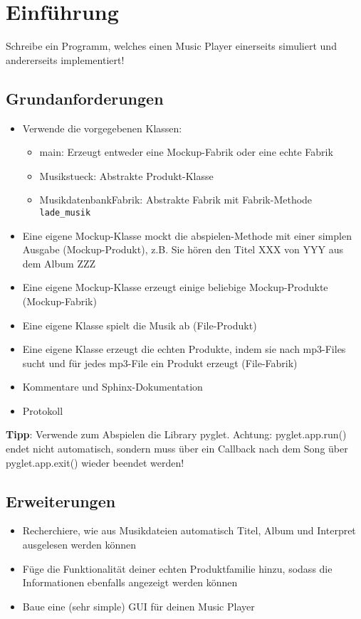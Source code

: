 
\section{Einführung}
Schreibe ein Programm, welches einen Music Player einerseits simuliert und andererseits implementiert!

\subsection{Grundanforderungen}
\begin{itemize}
\item Verwende die vorgegebenen Klassen:
	\begin{itemize}
		\item main: Erzeugt entweder eine Mockup-Fabrik oder eine echte Fabrik
		\item Musikstueck: Abstrakte Produkt-Klasse
		\item MusikdatenbankFabrik: Abstrakte Fabrik mit Fabrik-Methode \verb|lade_musik|
	\end{itemize}
\item Eine eigene Mockup-Klasse mockt die abspielen-Methode mit einer simplen Ausgabe (Mockup-Produkt), z.B. Sie hören den Titel XXX von YYY aus dem Album ZZZ
\item Eine eigene Mockup-Klasse erzeugt einige beliebige Mockup-Produkte (Mockup-Fabrik)
\item Eine eigene Klasse spielt die Musik ab (File-Produkt)
\item Eine eigene Klasse erzeugt die echten Produkte, indem sie nach mp3-Files sucht und für jedes mp3-File ein Produkt erzeugt (File-Fabrik)
\item Kommentare und Sphinx-Dokumentation
\item Protokoll
\end{itemize}
\textbf{Tipp}: Verwende zum Abspielen die Library pyglet. Achtung: pyglet.app.run() endet nicht automatisch, sondern muss über ein Callback nach dem Song über pyglet.app.exit() wieder beendet werden!

\subsection{Erweiterungen}
\begin{itemize}
\item Recherchiere, wie aus Musikdateien automatisch Titel, Album und Interpret ausgelesen werden können
\item Füge die Funktionalität deiner echten Produktfamilie hinzu, sodass die Informationen ebenfalls angezeigt werden können
\item Baue eine (sehr simple) GUI für deinen Music Player
\end{itemize}
\clearpage

